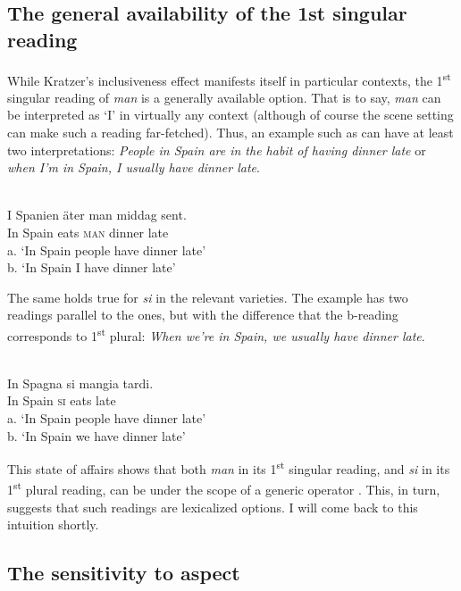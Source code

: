 \documentclass[output=paper]{LSP/langsci}
\begin{document}
\subsection{The general availability of the 1st singular reading}\label{sec:egerland:2.2}

While Kratzer’s inclusiveness effect manifests itself in particular contexts, the 1\textsuperscript{st} singular reading of  \textit{man} is a generally available option. That is to say, \textit{man} can be interpreted as ‘I’ in virtually any context (although of course the scene setting can make such a reading far-fetched). Thus, an example such as  can have at least two interpretations: \textit{People in Spain are in the habit of having dinner late} or \textit{when I’m in Spain, I usually have dinner late}.

\ea\label{ex:egerland:7}
\\
\gll I  Spanien  äter  man  middag  sent.\\
In  Spain    eats  \textsc{man}  dinner  late\\
\glt a. ‘In Spain people have dinner late’\\
     b. ‘In Spain I have dinner late’
\z

The same holds true for  \textit{si} in the relevant varieties. The example  has two readings parallel to the  ones, but with the difference that the b-reading corresponds to 1\textsuperscript{st} plural: \textit{When we’re in Spain, we usually have dinner late}.

\ea\label{ex:egerland:8}
\\
\gll In  Spagna  si  mangia  tardi.\\
In  Spain    \textsc{si}  eats    late\\
\glt a.  ‘In Spain people have dinner late’\\
  b.  ‘In Spain we have dinner late’
\z

This state of affairs shows that both  \textit{man} in its 1\textsuperscript{st} singular reading, and  \textit{si} in its 1\textsuperscript{st} plural reading, can be under the scope of a generic operator \citep{Chierchia1995}. This, in turn, suggests that such readings are lexicalized options. I will come back to this intuition shortly.

\subsection{The sensitivity to aspect}\label{sec:egerland:2.3}
\end{document}
